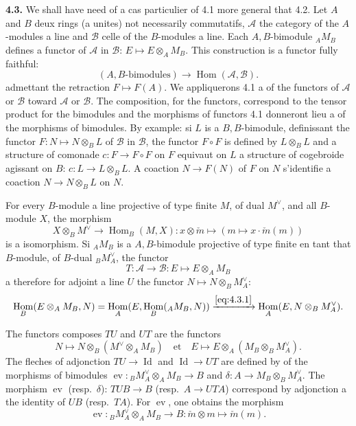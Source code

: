 \documentclass[12pt,a4paper]{article}
\theoremstyle{plain}
\theoremstyle{definition}
\theoremstyle{remark}
\DeclareMathOperator{\Hom}{Hom}
\DeclareMathOperator{\Id}{Id}
\DeclareMathOperator{\ev}{ev}
\begin{document}
\textbf{4.3.} We shall have need of a cas particulier of 4.1 more general that 4.2. Let $A$ and $B$ deux rings (a unites) not necessarily commutatifs, $\mathcal{A}$ the category of the $A$-modules a line and $\mathcal{B}$ celle of the $B$-modules a line. Each $A,B$-bimodule $_A M_B$ defines a functor of $\mathcal{A}$ in $\mathcal{B}$: $E \mapsto E \otimes_A M_B$. This construction is a functor fully faithful:
\[
(A,B\text{-bimodules}) \longrightarrow \Hom(\mathcal{A}, \mathcal{B}).
\]
admettant the retraction $F \mapsto F(A)$. We appliquerons 4.1 a of the functors of $\mathcal{A}$ or $\mathcal{B}$ toward $\mathcal{A}$ or $\mathcal{B}$. The composition, for the functors, correspond to the tensor product for the bimodules and the morphisms of functors 4.1 donneront lieu a of the morphisms of bimodules. By example: si $L$ is a $B,B$-bimodule, definissant the functor $F : N \mapsto N \otimes_B L$ of $\mathcal{B}$ in $\mathcal{B}$, the functor $F \circ F$ is defined by $L \otimes_B L$ and a structure of comonade $c : F \to F \circ F$ on $F$ equivaut on $L$ a structure of cogebroide agissant on $B$: $c : L \to L \otimes_B L$. A coaction $N \to F(N)$ of $F$ on $N$ s'identifie a coaction $N \to N \otimes_B L$ on $N$.

For every $B$-module a line projective of type finite $M$, of dual $M^\vee$, and all $B$-module $X$, the morphism
\begin{equation}\label{eq:4.3.1}
X \otimes_B M^\vee \to \Hom_B(M,X) : x \otimes \check{m} \mapsto (m \mapsto x \cdot \check{m}(m))
\end{equation}
is a isomorphism. Si $_A M_B$ is a $A,B$-bimodule projective of type finite en tant that $B$-module, of $B$-dual $_B M_A^\vee$, the functor
\[
T : \mathcal{A} \to \mathcal{B} : E \mapsto E \otimes_A M_B
\]
a therefore for adjoint a line $U$ the functor $N \mapsto N \otimes_B M_A^\vee$:
\[
\Hom_B(E \otimes_A M_B, N) = \Hom_A(E, \Hom_B(_A M_B, N)) \xrightarrow{\eqref{eq:4.3.1}} \Hom_A(E, N \otimes_B M_A^\vee).
\]

The functors composes $TU$ and $UT$ are the functors
\[
N \mapsto N \otimes_B (M^\vee \otimes_A M_B) \quad \text{et} \quad E \mapsto E \otimes_A (M_B \otimes_B M^\vee_A).
\]
The fleches of adjonction $TU \to \Id$ and $\Id \to UT$ are defined by of the morphisms of bimodules $\ev : {}_B M_A^\vee \otimes_A M_B \to B$ and $\delta : A \to M_B \otimes_B M_A^\vee$. The morphism $\ev$ (resp.~$\delta$): $TU B \to B$ (resp.~$A \to UT A$) correspond by adjonction a the identity of $UB$ (resp.~$TA$). For $\ev$, one obtains the morphism
\[
\ev : {}_B M_A^\vee \otimes_A M_B \to B : \check{m} \otimes m \mapsto \check{m}(m).
\]
\end{document}
